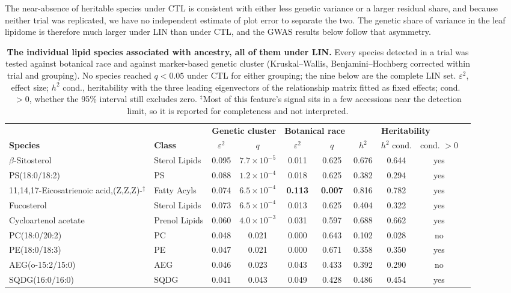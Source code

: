 \documentclass[9pt,twocolumn,twoside]{rilabRxiv}
\begin{document}
The near-absence of heritable species under CTL is consistent with either less genetic variance or a larger residual share, and because neither trial was replicated, we have no independent estimate of plot error to separate the two. The genetic share of variance in the leaf lipidome is therefore much larger under LIN than under CTL, and the GWAS results below follow that asymmetry.

\begin{table}[!ht]
\centering
\caption{\textbf{The individual lipid species associated with ancestry, all of them
under LIN.} Every species detected in a trial was tested against botanical race and
against marker-based genetic cluster (Kruskal--Wallis, Benjamini--Hochberg corrected
within trial and grouping). No species reached $q<0.05$ under CTL for either
grouping; the nine below are the complete LIN set. $\varepsilon^2$, effect size;
$h^2$ cond., heritability with the three leading eigenvectors of the relationship
matrix fitted as fixed effects; cond.\ $>0$, whether the 95\% interval still excludes
zero. $^{\ddagger}$Most of this feature's signal sits in a few accessions near the
detection limit, so it is reported for completeness and not interpreted.}
\label{tab:species_ancestry}
\small
\begin{tabular}{llcccccccc}
\toprule
& & \multicolumn{2}{c}{\textbf{Genetic cluster}} & \multicolumn{2}{c}{\textbf{Botanical race}} & \multicolumn{3}{c}{\textbf{Heritability}} \\
\cmidrule(lr){3-4}\cmidrule(lr){5-6}\cmidrule(lr){7-9}
\textbf{Species} & \textbf{Class} & $\varepsilon^2$ & $q$ & $\varepsilon^2$ & $q$ & $h^2$ & $h^2$ cond. & cond. $>0$ \\
\midrule
$\beta$-Sitosterol & Sterol Lipids & 0.095 & $7.7\times10^{-5}$ & 0.011 & 0.625 & 0.676 & 0.644 & yes \\
PS(18:0/18:2) & PS & 0.088 & $1.2\times10^{-4}$ & 0.018 & 0.625 & 0.382 & 0.294 & yes \\
11,14,17-Eicosatrienoic acid,(Z,Z,Z)-$^{\ddagger}$ & Fatty Acyls & 0.074 & $6.5\times10^{-4}$ & \textbf{0.113} & \textbf{0.007} & 0.816 & 0.782 & yes \\
Fucosterol & Sterol Lipids & 0.073 & $6.5\times10^{-4}$ & 0.013 & 0.625 & 0.404 & 0.322 & yes \\
Cycloartenol acetate & Prenol Lipids & 0.060 & $4.0\times10^{-3}$ & 0.031 & 0.597 & 0.688 & 0.662 & yes \\
PC(18:0/20:2) & PC & 0.048 & 0.021 & 0.000 & 0.643 & 0.102 & 0.028 & no \\
PE(18:0/18:3) & PE & 0.047 & 0.021 & 0.000 & 0.671 & 0.358 & 0.350 & yes \\
AEG(o-15:2/15:0) & AEG & 0.046 & 0.023 & 0.043 & 0.433 & 0.392 & 0.290 & no \\
SQDG(16:0/16:0) & SQDG & 0.041 & 0.043 & 0.049 & 0.428 & 0.486 & 0.454 & yes \\
\bottomrule
\end{tabular}
\end{table}
\end{document}
